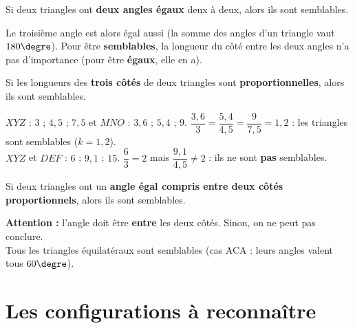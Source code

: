 \documentclass[11pt]{article}
\newcommand{\f}[2]{\dfrac{#1}{#2}}
\begin{document}
\begin{propriete}
Si deux triangles ont \textbf{deux angles égaux} deux à deux, alors ils sont semblables.
\end{propriete}
\par\medskip\noindent\hspace{0pt}
\par
\begin{remarque}
Le troisième angle est alors égal aussi (la somme des angles d'un triangle vaut $180\degre$).
Pour être \textbf{semblables}, la longueur du côté entre les deux angles n'a pas d'importance (pour être \textbf{égaux}, elle en a).
\end{remarque}

\begin{propriete}
Si les longueurs des \textbf{trois côtés} de deux triangles sont \textbf{proportionnelles}, alors ils sont semblables.
\end{propriete}
\par\medskip\noindent\hspace{0pt}
\par
\begin{exemple}
$XYZ$ : $3$ ; $4,5$ ; $7,5$ \quad et \quad $MNO$ : $3,6$ ; $5,4$ ; $9$. \quad
$\f{3,6}{3} = \f{5,4}{4,5} = \f{9}{7,5} = 1,2$ : les triangles sont semblables ($k = 1,2$).\\
$XYZ$ et $DEF$ : $6$ ; $9,1$ ; $15$. \quad $\f{6}{3} = 2$ mais $\f{9,1}{4,5} \neq 2$ : ils ne sont \textbf{pas} semblables.
\end{exemple}

\begin{propriete}
Si deux triangles ont un \textbf{angle égal compris entre deux côtés proportionnels}, alors ils sont semblables.
\end{propriete}
\par\medskip\noindent\hspace{0pt}
\par
\begin{remarque}
\textbf{Attention :} l'angle doit être \textbf{entre} les deux côtés. Sinon, on ne peut pas conclure.\\
Tous les triangles équilatéraux sont semblables (cas ACA : leurs angles valent tous $60\degre$).
\end{remarque}

\section{Les configurations à reconnaître}
\end{document}
